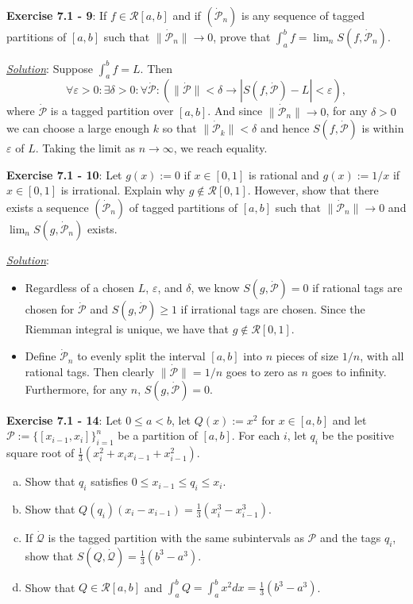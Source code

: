 \documentclass{article}
\newcommand{\Pdot}{\dot{\mathcal P}}
\begin{document}
\textbf{Exercise 7.1 - 9}:
If $f \in \mathcal R[a, b]$ and if $(\Pdot_n)$ is any sequence of tagged
partitions of $[a, b]$ such that $\|\Pdot_n\| \to 0$, prove that
$\int_a^b f = \lim_n S(f, \Pdot_n)$.

\underline{\textit{Solution}}:
Suppose $\int_a^b f = L$. Then
\[
  \forall \varepsilon > 0:
  \exists \delta > 0:
  \forall \Pdot:
  (\|\Pdot\| < \delta \longrightarrow |S(f, \Pdot) - L| < \varepsilon),
\]
where $\Pdot$ is a tagged partition over $[a,b]$. And since
$\|\Pdot_n\| \to 0$, for any $\delta > 0$ we can choose a large enough $k$
so that $\|\Pdot_k\| < \delta$ and hence $S(f, \Pdot)$ is within
$\varepsilon$ of $L$. Taking the limit as $n \to \infty$, we reach
equality.

\hrulefill

\textbf{Exercise 7.1 - 10}:
Let $g(x) := 0$ if $x \in [0, 1]$ is rational and $g(x) := 1/x$ if
$x \in [0, 1]$ is irrational. Explain why $g \notin \mathcal R [0, 1]$.
However, show that there exists a sequence $(\Pdot_n)$ of tagged partitions
of $[a, b]$ such that $\|\Pdot_n\| \to 0$ and $\lim_n S(g, \Pdot_n)$ exists.

\underline{\textit{Solution}}:
\begin{itemize}
  \item Regardless of a chosen $L$, $\varepsilon$, and $\delta$, we know
    $S(g, \Pdot) = 0$ if rational tags are chosen for $\Pdot$ and
    $S(g, \Pdot) \geq 1$ if irrational tags are chosen. Since the Riemman
    integral is unique, we have that $g \notin \mathcal R [0, 1]$.
  \item Define $\Pdot_n$ to evenly split the interval $[a, b]$ into $n$
    pieces of size $1/n$, with all rational tags. Then clearly
    $\|\Pdot\| = 1/n$ goes to zero as $n$ goes to infinity. Furthermore,
    for any $n$, $S(g, \Pdot)=0$.
\end{itemize}

\hrulefill

\textbf{Exercise 7.1 - 14}: 
Let $0 \leq a < b$, let $Q(x) := x^2$ for $x \in [a, b]$ and let
$\mathcal P := \{[x_{i-1}, x_i]\}_{i=1}^n$ be a partition of $[a, b]$.
For each $i$, let $q_i$ be the positive square root of
$\frac{1}{3} (x_i^2 + x_i x_{i-1} + x^2_{i-1})$.
\begin{enumerate}[(a)]
  \item Show that $q_i$ satisfies $0 \leq x_{i-1} \leq q_i \leq x_i$.
  \item Show that $Q(q_i) (x_i - x_{i-1})
    = \frac{1}{3} (x_i^3 - x_{i-1}^3)$.
  \item If $\dot{\mathcal Q}$ is the tagged partition with the same
    subintervals as $\mathcal P$ and the tags $q_i$, show that
    $S(Q, \dot{\mathcal Q}) = \frac{1}{3} (b^3 - a^3)$.
  \item Show that $Q \in \mathcal R[a, b]$ and
    $\int_a^b Q = \int_a^b x^2 dx = \frac{1}{3} (b^3 - a^3)$.
\end{enumerate}
\end{document}
